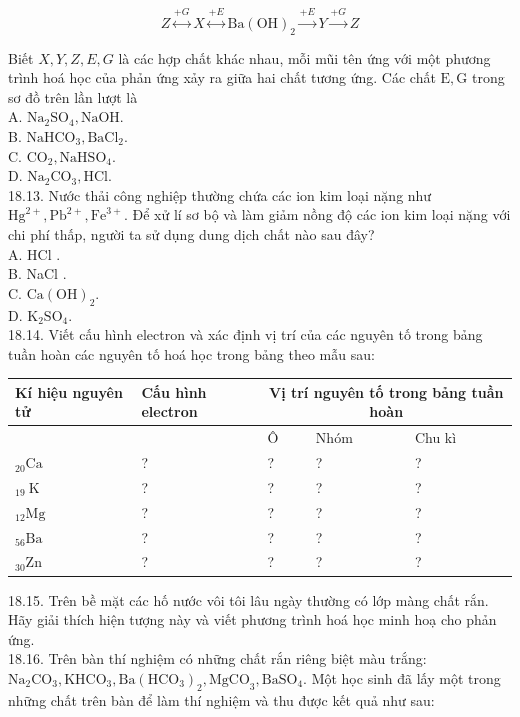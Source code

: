 \documentclass[10pt]{article}
\begin{document}
$$
Z \stackrel{+G}{\longleftrightarrow} X \stackrel{+E}{\longleftrightarrow} \mathrm{Ba}(\mathrm{OH})_{2} \xrightarrow{+E} Y \xrightarrow{+G} Z
$$

Biết $X, Y, Z, E, G$ là các hợp chất khác nhau, mỗi mũi tên ứng với một phương trình hoá học của phản ứng xảy ra giữa hai chất tương ứng. Các chất $\mathrm{E}, \mathrm{G}$ trong sơ đồ trên lần lượt là\\
A. $\mathrm{Na}_{2} \mathrm{SO}_{4}, \mathrm{NaOH}$.\\
B. $\mathrm{NaHCO}_{3}, \mathrm{BaCl}_{2}$.\\
C. $\mathrm{CO}_{2}, \mathrm{NaHSO}_{4}$.\\
D. $\mathrm{Na}_{2} \mathrm{CO}_{3}, \mathrm{HCl}$.\\
18.13. Nước thải công nghiệp thường chứa các ion kim loại nặng như $\mathrm{Hg}^{2+}, \mathrm{Pb}^{2+}, \mathrm{Fe}^{3+}$. Để xử lí sơ bộ và làm giảm nồng độ các ion kim loại nặng với chi phí thấp, người ta sử dụng dung dịch chất nào sau đây?\\
A. HCl .\\
B. NaCl .\\
C. $\mathrm{Ca}(\mathrm{OH})_{2}$.\\
D. $\mathrm{K}_{2} \mathrm{SO}_{4}$.\\
18.14. Viết cấu hình electron và xác định vị trí của các nguyên tố trong bảng tuần hoàn các nguyên tố hoá học trong bảng theo mẫu sau:

\begin{center}
\begin{tabular}{|l|l|l|l|l|}
\hline
\multirow{2}{*}{Kí hiệu nguyên tử} & \multirow{2}{*}{Cấu hình electron} & \multicolumn{3}{|c|}{Vị trí nguyên tố trong bảng tuần hoàn} \\
\hline
 &  & Ô & Nhóm & Chu kì \\
\hline
${ }_{20} \mathrm{Ca}$ & ? & ? & ? & ? \\
\hline
${ }_{19} \mathrm{~K}$ & ? & ? & ? & ? \\
\hline
${ }_{12} \mathrm{Mg}$ & ? & ? & ? & ? \\
\hline
${ }_{56} \mathrm{Ba}$ & ? & ? & ? & ? \\
\hline
${ }_{30} \mathrm{Zn}$ & ? & ? & ? & ? \\
\hline
\end{tabular}
\end{center}

18.15. Trên bề mặt các hố nước vôi tôi lâu ngày thường có lớp màng chất rắn. Hãy giải thích hiện tượng này và viết phương trình hoá học minh hoạ cho phản ứng.\\
18.16. Trên bàn thí nghiệm có những chất rắn riêng biệt màu trắng: $\mathrm{Na}_{2} \mathrm{CO}_{3}, \mathrm{KHCO}_{3}, \mathrm{Ba}\left(\mathrm{HCO}_{3}\right)_{2}, \mathrm{MgCO}_{3}, \mathrm{BaSO}_{4}$. Một học sinh đã lấy một trong những chất trên bàn để làm thí nghiệm và thu được kết quả như sau:
\end{document}
